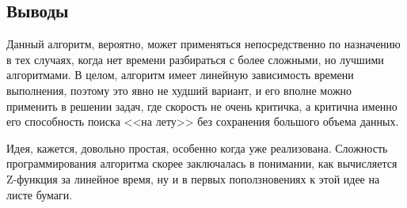\documentclass[12pt]{article}
\begin{document}
\subsection*{Выводы}

Данный алгоритм, вероятно, может применяться непосредственно по назначению в тех случаях, когда нет времени разбираться с более сложными, но лучшими алгоритмами.
В целом, алгоритм имеет линейную зависимость времени выполнения, поэтому это явно не худший вариант, и его вполне можно применить в решении задач, где скорость не очень критичка, а критична именно его способность поиска <<на лету>> без сохранения большого объема данных.

Идея, кажется, довольно простая, особенно когда уже реализована. Сложность программирования алгоритма скорее заключалась в понимании, как вычисляется Z-функция за линейное время, ну и в первых поползновениях к этой идее на листе бумаги.
\end{document}
